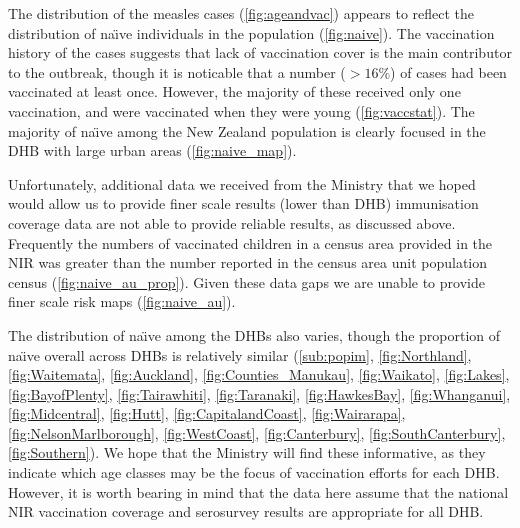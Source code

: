 \documentclass{article}
\begin{document}
The distribution of the measles cases (\autoref{fig:ageandvac}) appears to reflect the distribution of na\"{\i}ve individuals in the population (\autoref{fig:naive}). The vaccination history of the cases suggests that lack of vaccination cover is the main contributor to the outbreak, though it is noticable that a number ($>16\%$) of cases had been vaccinated at least once. However, the majority of these received only one vaccination, and were vaccinated when they were young (\autoref{fig:vaccstat}). The majority of na\"{\i}ve among the New Zealand population is clearly focused in the DHB with large urban areas (\autoref{fig:naive_map}). 

Unfortunately, additional data we received from the Ministry that we hoped would allow us to provide finer scale results (lower than DHB) immunisation coverage data are not able to provide reliable results, as discussed above. Frequently the numbers of vaccinated children in a census area provided in the NIR was greater than the number reported in the census area unit population census (\autoref{fig:naive_au_prop}). Given these data gaps we are unable to provide finer scale risk maps (\autoref{fig:naive_au}).

The distribution of na\"{\i}ve among the DHBs also varies, though the proportion of na\"{\i}ve overall across DHBs is relatively similar (\autoref{sub:popim}, \autoref{fig:Northland}, \autoref{fig:Waitemata}, \autoref{fig:Auckland}, \autoref{fig:Counties_Manukau}, \autoref{fig:Waikato}, \autoref{fig:Lakes}, \autoref{fig:BayofPlenty}, \autoref{fig:Tairawhiti}, \autoref{fig:Taranaki}, \autoref{fig:HawkesBay}, \autoref{fig:Whanganui}, \autoref{fig:Midcentral}, \autoref{fig:Hutt}, \autoref{fig:CapitalandCoast}, \autoref{fig:Wairarapa}, \autoref{fig:NelsonMarlborough}, \autoref{fig:WestCoast}, \autoref{fig:Canterbury}, \autoref{fig:SouthCanterbury}, \autoref{fig:Southern}).  We hope that the Ministry will find these informative, as they indicate which age classes may be the focus of vaccination efforts for each DHB. However, it is worth bearing in mind that the data here assume that the national NIR vaccination coverage and serosurvey results are appropriate for all DHB.
\end{document}
